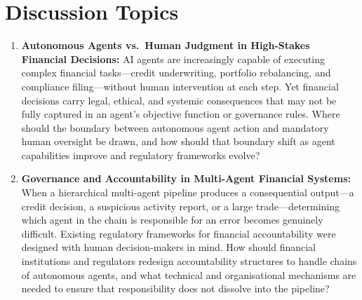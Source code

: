 \documentclass{article}
\begin{document}
\section{Discussion Topics}
\begin{enumerate}
    \item \textbf{Autonomous Agents vs.\ Human Judgment in High-Stakes Financial Decisions:} AI agents are increasingly capable of executing complex financial tasks---credit underwriting, portfolio rebalancing, and compliance filing---without human intervention at each step. Yet financial decisions carry legal, ethical, and systemic consequences that may not be fully captured in an agent's objective function or governance rules. Where should the boundary between autonomous agent action and mandatory human oversight be drawn, and how should that boundary shift as agent capabilities improve and regulatory frameworks evolve?

    \item \textbf{Governance and Accountability in Multi-Agent Financial Systems:} When a hierarchical multi-agent pipeline produces a consequential output---a credit decision, a suspicious activity report, or a large trade---determining which agent in the chain is responsible for an error becomes genuinely difficult. Existing regulatory frameworks for financial accountability were designed with human decision-makers in mind. How should financial institutions and regulators redesign accountability structures to handle chains of autonomous agents, and what technical and organisational mechanisms are needed to ensure that responsibility does not dissolve into the pipeline?




\end{enumerate}
\end{document}
